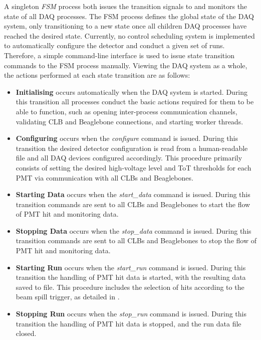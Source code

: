 A singleton \emph{FSM} process both issues the transition signals to and monitors the state of all
DAQ processes. The FSM process defines the global state of the DAQ system, only transitioning to a
new state once all children DAQ processes have reached the desired state. Currently, no control
scheduling system is implemented to automatically configure the detector and conduct a given set
of runs. Therefore, a simple command-line interface is used to issue state transition commands to
the FSM process manually. Viewing the DAQ system as a whole, the actions performed at each state
transition are as follows:
\begin{itemize}
    \item \textbf{Initialising} occurs automatically when the DAQ system is started. During this
    transition all processes conduct the basic actions required for them to be able to function,
    such as opening inter-process communication channels, validating CLB and Beaglebone
    connections, and starting worker threads.
    \item \textbf{Configuring} occurs when the \emph{configure} command is issued. During this
    transition the desired detector configuration is read from a human-readable file and all DAQ
    devices configured accordingly. This procedure primarily consists of setting the desired
    high-voltage level and ToT thresholds for each PMT via communication with all CLBs and
    Beaglebones.
    \item \textbf{Starting Data} occurs when the \emph{start\_data} command is issued. During this
    transition commands are sent to all CLBs and Beaglebones to start the flow of PMT hit and
    monitoring data.
    \item \textbf{Stopping Data} occurs when the \emph{stop\_data} command is issued. During this
    transition commands are sent to all CLBs and Beaglebones to stop the flow of PMT hit and
    monitoring data.
    \item \textbf{Starting Run} occurs when the \emph{start\_run} command is issued. During this
    transition the handling of PMT hit data is started, with the resulting data saved to file.
    This procedure includes the selection of hits according to the \numi beam spill trigger, as
    detailed in .
    \item \textbf{Stopping Run} occurs when the \emph{stop\_run} command is issued. During this
    transition the handling of PMT hit data is stopped, and the run data file closed.
\end{itemize}


